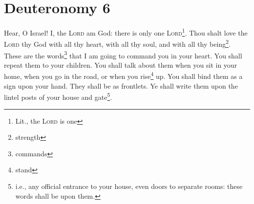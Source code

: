 \section{Deuteronomy 6}\label{Deuteronomy 6}
\begin{enumerate}
     Hear, O Israel! I, the \textsc{Lord} am God: there is only one \textsc{Lord}\footnote{Lit., the \textsc{Lord} is one}.%
     Thou shalt love the \textsc{Lord} thy God with all thy heart, with all thy soul, and with all thy being\footnote{strength}.%
     These are the words\footnote{commands} that I am going to command you in your heart.%
     You shall repeat them to your children. You shall talk about them when you sit in your home, when you go in the road, or when you rise\footnote{stand} up.%
     You shall bind them as a sign upon your hand. They shall be as frontlets.%
     Ye shall write them upon the lintel posts of your house and gate\footnote{i.e., any official entrance to your house, even doors to separate rooms: these words shall be upon them.}.%
\end{enumerate}

